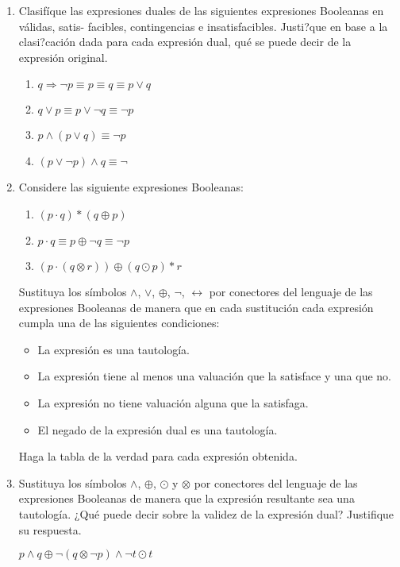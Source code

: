 \documentclass{article}
\begin{document}
\begin{enumerate}
	\item Clasifíque las expresiones duales de las siguientes expresiones Booleanas en válidas, satis-
	facibles, contingencias e insatisfacibles. Justi?que en base a la clasi?cación dada para cada
	expresión dual, qué se puede decir de la expresión original.

	\begin{enumerate}
		\item $q \Rightarrow \neg p \equiv p \equiv q \equiv p \lor q$

		\item $q \lor p \equiv p \lor \neg q \equiv \neg p$

		\item $p \land (p \lor q) \equiv \neg p$

		\item $(p \lor \neg p) \land q \equiv \neg$ 
	\end{enumerate}

	\item Considere las siguiente expresiones Booleanas:
	\begin{enumerate}
		\item $(p \cdot q) * (q \oplus p)$

		\item $p \cdot q \equiv p \oplus \neg q \equiv \neg p$
		
		\item $(p \cdot (q \otimes r)) \oplus (q \odot p) * r$
	\end{enumerate}

	Sustituya los símbolos $\land$, $\lor$, $\oplus$, $\neg$, $\leftrightarrow$ por conectores del lenguaje de las expresiones Booleanas de manera que en cada sustitución cada expresión cumpla una de las siguientes condiciones:
	
	\begin{itemize}
		\item La expresión es una tautología.
		\item La expresión tiene al menos una valuación que la satisface y una que no.
		\item La expresión no tiene valuación alguna que la satisfaga.
		\item El negado de la expresión dual es una tautología.
	\end{itemize}

	Haga la tabla de la verdad para cada expresión obtenida.

	\item Sustituya los símbolos $\land$, $\oplus$, $\odot$ y $\otimes$ por conectores del lenguaje de las expresiones Booleanas de manera que la expresión resultante sea una tautología. ¿Qué puede decir sobre la validez de la expresión dual? Justifique su respuesta.\par
	$p \land q \oplus \neg(q \otimes \neg p) \land \neg t \odot t$


\end{enumerate}
\end{document}
